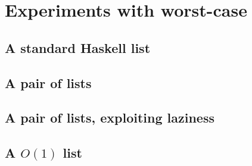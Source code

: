 \section*{Experiments with worst-case}

\subsection*{A standard Haskell list}
\subsection*{A pair of lists}
\subsection*{A pair of lists, exploiting laziness}
\subsection*{A $O(1)$ list}